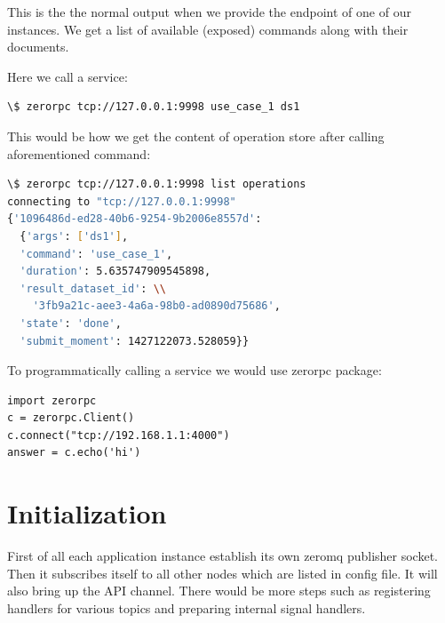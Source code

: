 This is the the normal output when we provide the endpoint of one of our instances. 
We get a list of available (exposed) commands along with their documents.

Here we call a service:
\begin{lstlisting}[language=sh, caption={Running an operation on a dataset}]
\$ zerorpc tcp://127.0.0.1:9998 use_case_1 ds1
\end{lstlisting}

This would be how we get the content of operation store after calling aforementioned command:

\begin{lstlisting}[language=sh, caption={Getting list of operations}]
\$ zerorpc tcp://127.0.0.1:9998 list operations
connecting to "tcp://127.0.0.1:9998"
{'1096486d-ed28-40b6-9254-9b2006e8557d': 
  {'args': ['ds1'],
  'command': 'use_case_1',
  'duration': 5.635747909545898,
  'result_dataset_id': \\
  	'3fb9a21c-aee3-4a6a-98b0-ad0890d75686',
  'state': 'done',
  'submit_moment': 1427122073.528059}}
\end{lstlisting}

To programmatically calling a service we would use zerorpc package:

\begin{lstlisting}[caption={Connecting to an API endpoint in ZeroRPC}]
import zerorpc
c = zerorpc.Client()
c.connect("tcp://192.168.1.1:4000")
answer = c.echo('hi')
\end{lstlisting}


\section{Initialization}
First of all each application instance establish its own zeromq publisher socket. Then it subscribes
itself to all other nodes which are listed in config file. It will also bring up the API channel.
There would be more steps such as registering handlers for various topics and preparing internal
signal handlers.
